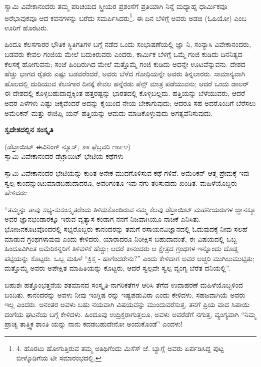ಸ್ವಾಮಿ ವಿವೇಕಾನಂದರು ತಮ್ಮ ಪರಿಚಯದ ಸ್ತ್ರೀಯರ ಪ್ರಶಂಸೆಗೆ ಪ್ರತಿಯಾಗಿ ನಿನ್ನೆ ಮಧ್ಯಾಹ್ನ ಧಾರ್ಮಿಕವೂ ಅರೆಭಾವುಕವೂ ಆದ ಕವನಗಳನ್ನು ಬರೆದು ಸಮರ್ಪಿಸಿದರು\footnote{4. ಹೊರಟು ಹೋಗುತ್ತಿರುವ ತಮ್ಮ ಅತಿಥಿಗೆಂದು ಮಿಸೆಸ್ ಜೆ. ಬ್ಯಾಗ್ಲೆ ಅವರು ಏರ್ಪಡಿಸಿದ್ದ ಪುಟ್ಟ ಬೀಳ್ಕೊಡಿಗೆಯ ಟೀ ಸಮಾರಂಭದಲ್ಲಿ.}. ಈ ದಿನ ಬೆಳಿಗ್ಗೆ ಅವರು ಅಡಙ (ಓಹಿಯೋ) ಎಂಬ ಊರಿಗೆ ಹೊರಟರು.

ಹಿಂದೂ ಕೆಲಸಗಾರರ ಭೌತಿಕ ಸ್ಥಿತಿಗತಿಗಳ ಬಗ್ಗೆ ನಡೆದ ಒಂದು ಸಂಭಾಷಣೆಯಲ್ಲಿ ಜ್ಞಾ ನಿ, ಸಂನ್ಯಾಸಿ ವಿವೇಕಾನಂದರು, ಬಡವರು ಕೇವಲ ಗಂಜಿಯ ಮೇಲೆ ಬದುಕಿರುವರು ಎಂದರು. ಕಾರ್ಮಿಕ ಬೆಳಗ್ಗೆ ಒಮ್ಮೆ ಗಂಜಿ ಕುಡಿದು ದಿನನಿತ್ಯದ ಕೆಲಸಕ್ಕೆ ಹೋಗುವನು; ಸಂಜೆ ಹಿಂದಿರುಗಿದ ಮೇಲೆ ಮತ್ತೊಮ್ಮೆ ಗಂಜಿ ಕುಡಿದು ಅದನ್ನೇ ಊಟವೆನ್ನುವನು. ದೇಶದ ಹೆಚ್ಚು ಭಾಗದ ರೈತರು ಎಷ್ಟು ಬಡವರೆಂದರೆ, ಅವರು ಬೆಳೆದ ಗೋಧಿಯನ್ನೇ ಅವರು ತಿನ್ನಲಾರರು. ಸಾಮಾನ್ಯವಾಗಿ ಹೊಲದಲ್ಲಿ ದುಡಿಯುವ ಕೆಲಸಗಾರ ದಿನಕ್ಕೆ ಕೇವಲ ಹನ್ನೆರಡು ಪೆನ್ಸ್ ಮಾತ್ರ ಪಡೆಯುವನು; ಆದರೆ ಒಂದು ಡಾಲರ್ ಈ ದೇಶದಲ್ಲಿ ಕೊಳ್ಳಬಹುದಾದ್ದಕ್ಕಿಂತ ಹತ್ತರಷ್ಟನ್ನು ಭಾರತದಲ್ಲಿ ಕೊಳ್ಳಬಲ್ಲದು. ಹತ್ತಿಯನ್ನು ಬೆಳೆಯುವರು, ಆದರೆ ಅದರ ಎಳೆಗಳು ಎಷ್ಟು ಚಿಕ್ಕವೆಂದರೆ ಅದನ್ನು ಕೈಯಿಂದ ನೇಯ ಬೇಕಾಗುವುದು; ಆದರೂ ಸಹ ಅದರೊಂದಿಗೆ ಬೆರೆಸಲು ಅಮೆರಿಕನ್ ಮತ್ತು ಈಜಿಪ್ಷಿ ಯನ್ ಹತ್ತಿಯನ್ನು ಆಮದು ಮಾಡಿಕೊಳ್ಳುವುದು ಅಗತ್ಯವೆನಿಸುವುದು.

\begin{center}
\textbf{ಸ್ವದೇಶದಲ್ಲಿನ ಸಂಸ್ಕೃತಿ}
\end{center}

\begin{center}
(ಡೆಟ್ರಾಯಿಟ್ ಈವಿನಿಂಗ್ ನ್ಯೂಸ್, ೨೫ ಫೆಬ್ರವರಿ ೧೮೯೪)\\ಸ್ವಾಮಿ ವಿವೇಕಾನಂದರ ಡೆಟ್ರಾಯಿಟ್ ಭೇಟಿಯ ಕಥೆಗಳು
\end{center}

ಸ್ವಾಮಿ ವಿವೇಕಾನಂದರ ಭೇಟಿಯನ್ನು ಕುರಿತ ಅನೇಕ ಮುದಗೊಳಿಸುವ ಕಥೆ ಗಳಿವೆ. ಅಮೆರಿಕನ್ ಆತ್ಮ ಪ್ರೇಮಕ್ಕೆ ಇವು ಸ್ವಲ್ಪ ಕುಂದನ್ನುಂಟುಮಾಡಬಹುದಾದರೂ, ಅವರಿಗಂತೂ ಇವು ನಗು ತರಿಸುವುದು ಖಂಡಿತ. ಮಹಿಳೆಯೊಬ್ಬರು ಹೇಳಿದರು:

“ತಮ್ಮನ್ನು ತಾವು ಸಭ್ಯ-ಸುಸಂಸ್ಕೃತರೆಂದು ತಿಳಿದುಕೊಂಡಿರುವ ನಮ್ಮ ಕೆಲವು ಡೆಟ್ರಾಯಿಟ್ ಮಹನೀಯರುಗಳ ಜ್ಞಾನಕ್ಕೂ ಅವರ ಜ್ಞಾನಭಂಡಾರಕ್ಕೂ ಇರುವ ವ್ಯತ್ಯಾಸ ಕಂಡಾಗ ನನಗೆ ನಿಜವಾಗಿಯೂ ನಾಚಿಕೆ ಎನಿಸಿತು. ಭೋಜನಕೂಟವೊಂದರಲ್ಲಿ ಸಭ್ಯರೊಬ್ಬರು ಕಾನಂದರನ್ನು ತಮಗೆ ರಸಾಯನವಿಜ್ಞಾನದಲ್ಲಿ ಓದುವುದಕ್ಕೆ ನೀವು ಸಲಹೆ ಮಾಡುವ ಗ್ರಂಥಗಳಾವುವು ಎಂದು ಕೇಳಿದರು. ಯಾರಾದರೂ ನಿರೀಕ್ಷಿಸ ಬಹುದಾದಂತೆ, ಈ ವಿಷಯದಲ್ಲಿ ಒಬ್ಬ ಹಿಂದೂವಿಗಿಂತ ಅಮೆರಿಕನ್ನರಿಗೆ ತಿಳಿವಳಿಕೆ ಹೆಚ್ಚು; ಆದರೆ ಕಾನಂದರು ಆ ಕ್ಷೇತ್ರದ ಗ್ರಂಥಗಳ ಇನ್ನೊಂದು ದೊಡ್ಡ ಪಟ್ಟಿಯನ್ನು ಕೊಟ್ಟರು. ಒಬ್ಬ ಮಹಿಳೆ “ಕ್ರಿಸ್ತ - ಹಾಗೆಂದರೇನು?” ಎಂದು ಕೇಳಿದಾಗ ಅವರ ಅಚ್ಚರಿ ಮುಗಿಲುಮುಟ್ಟಿತು; ಮತ್ತೊಮ್ಮೆ ಅವರು ಅಪೇಕ್ಷಿತ ಮಾಹಿತಿಯನ್ನು ಕೊಟ್ಟರು, ಆದರೆ ಸ್ವಲ್ಪವೇ ಸ್ವಲ್ಪ ವ್ಯಂಗ್ಯ ಬೆರೆತ ದನಿಯಲ್ಲಿ”.

ಬಹುಶಃ ಹತ್ತೊಂಭತ್ತನೆಯ ಶತಮಾನದ ಸಂಸ್ಕೃತಿ-ನಾಗರಿಕತೆಗಳ ಆರಿಸಿ ತೆಗೆದ ಉದಾಹರಣೆ ಮಹಿಳೆಯೊಬ್ಬಳಿಂದ ಬಂದಿತು. ಕಾನಂದರನ್ನು ಅವಳು ನೀವು ಇಂಗ್ಲಿಷ ರನ್ನು ಇಷ್ಟಪಡುವಿರಾ ಎಂದು ಕೇಳಿದಳು. ಸಹಜವಾಗಿಯೆ ಅವರು ಇಲ್ಲ ಎಂದರು. ಅನಂತರ ಅವಳು ಬಹು ನಯವಾಗಿ ವಿಷಯವನ್ನು ಮುಂದುವರೆಸುತ್ತ, ತನಗೆ ಪ್ರಿಯ ವಾದ ಸಿಪಾಯಿ ದಂಗೆಯ ಘಟನೆಯ ಬಗ್ಗೆ ಕೇಳಿದಳು. ಹಿಂದೂವು ಉದ್ರಿಕ್ತರಾಗುತ್ತಲೂ, ಅವಳು ಅವರೆಡೆಗೆ ನಗುತ್ತ, ವ್ಯಂಗ್ಯವಾಗಿ “ನಿಮ್ಮ ಪ್ರಾಚ್ಯ ತಾತ್ತ್ವಿಕ ಶಾಂತಿ ಯನ್ನು ನಾನು ಕದಡಬಹುದೇನೋ ಅಂದುಕೊಂಡೆ” ಎಂದಳು!

